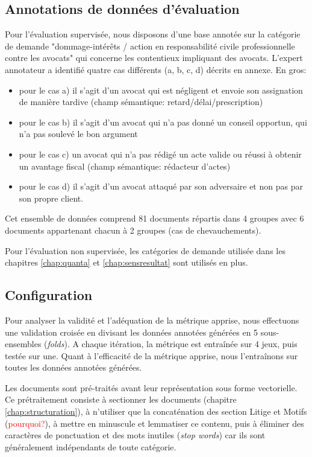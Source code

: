 \subsection{Annotations de données d'évaluation}
Pour l'évaluation supervisée, nous disposons d'une base annotée sur la catégorie de demande "dommage-intérêts / action en responsabilité civile professionnelle contre les avocats" qui concerne les contentieux impliquant des avocats.
L'expert annotateur a identifié quatre cas différents (a, b, c, d) décrits en annexe. En gros:
\begin{itemize}
\item pour le cas a) il s'agit d'un avocat qui est négligent et envoie son assignation de manière tardive (champ sémantique: retard/délai/prescription)
\item pour le cas b) il s'agit d'un avocat qui n'a pas donné un conseil opportun, qui n'a pas soulevé le bon argument
\item pour le cas c) un avocat qui n'a pas rédigé un acte valide ou réussi à obtenir un avantage fiscal (champ sémantique: rédacteur d'actes)
\item pour le cas d) il s'agit d'un avocat attaqué par son adversaire et non pas par son propre client.
\end{itemize}

Cet ensemble de données comprend 81 documents répartis dans 4 groupes avec 6 documents appartenant chacun à 2 groupes (cas de chevauchements).

Pour l'évaluation non supervisée, les catégories de demande utilisée dans les chapitres \ref{chap:quanta} et \ref{chap:sensresultat} sont utilisés en plus.

\subsection{Configuration}
Pour analyser la validité et l'adéquation de la métrique apprise, nous effectuons une validation croisée en divisant les données annotées générées en 5 sous-ensembles (\textit{folds}). A chaque itération, la métrique est entraînée sur 4 jeux, puis testée sur une. Quant à l'efficacité de la métrique apprise, nous l'entraînons sur toutes les données annotées générées.

Les documents sont pré-traités avant leur représentation sous forme vectorielle. Ce prétraitement consiste à sectionner les documents (chapitre \ref{chap:structuration}), à n'utiliser que la concaténation des section Litige et Motifs (\textcolor{red}{pourquoi?}), à mettre en minuscule et lemmatiser ce contenu, puis à éliminer des caractères de ponctuation et des mots inutiles (\textit{stop words})  car ils sont généralement indépendants de toute catégorie.

